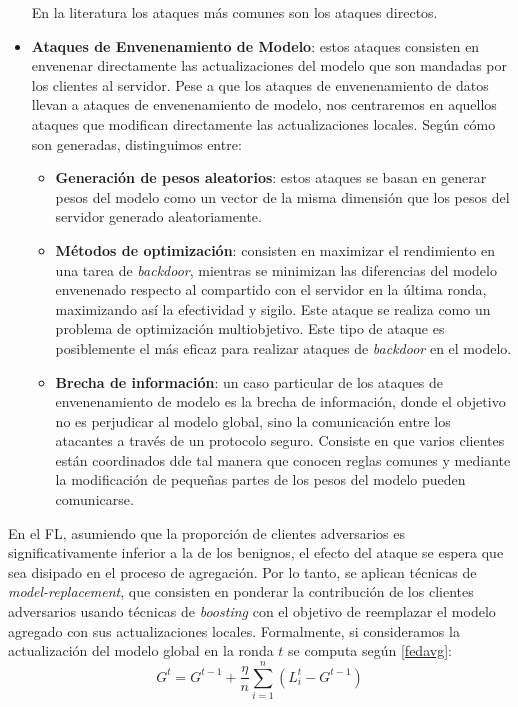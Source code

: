 \begin{itemize}
    En la literatura los ataques más comunes son los ataques directos.
    \item \textbf{Ataques de Envenenamiento de Modelo}: estos ataques consisten en envenenar directamente las actualizaciones del modelo que son mandadas por los clientes al servidor. Pese a que los ataques de envenenamiento de datos llevan a ataques de envenenamiento de modelo, nos centraremos en aquellos ataques que modifican directamente las actualizaciones locales. Según cómo son generadas, distinguimos entre:
    \begin{itemize}
        \item \textbf{Generación de pesos aleatorios}: estos ataques se basan en generar pesos del modelo como un vector de la misma dimensión que los pesos del servidor generado aleatoriamente.
        \item \textbf{Métodos de optimización}: consisten en maximizar el rendimiento en una tarea de \textit{backdoor}, mientras se minimizan las diferencias del modelo envenenado respecto al compartido con el servidor en la última ronda, maximizando así la efectividad y sigilo. Este ataque se realiza como un problema de optimización multiobjetivo. Este tipo de ataque es posiblemente el más eficaz para realizar ataques de \textit{backdoor} en el modelo.
        \item \textbf{Brecha de información}: un caso particular de los ataques de envenenamiento de modelo es la brecha de información, donde el objetivo no es perjudicar al modelo global, sino la comunicación entre los atacantes a través de un protocolo seguro. Consiste en que varios clientes están coordinados dde tal manera que conocen reglas comunes y mediante la modificación de pequeñas partes de los pesos del modelo pueden comunicarse.
    \end{itemize}
\end{itemize}

En el \ac{FL}, asumiendo que la proporción de clientes adversarios es significativamente inferior a la de los benignos, el efecto del ataque se espera que sea disipado en el proceso de agregación. Por lo tanto, se aplican técnicas de \textit{model-replacement}, que consisten en ponderar la contribución de los clientes adversarios usando técnicas de \textit{boosting} con el objetivo de reemplazar el modelo agregado con sus actualizaciones locales. Formalmente, si consideramos la actualización del modelo global en la ronda $t$ se computa según \eqref{fedavg}:
\begin{equation}\label{fedavg}
    G^t = G^{t-1} + \frac{\eta}{n}\sum^n_{i=1}(L^t_i - G^{t-1})
\end{equation}

